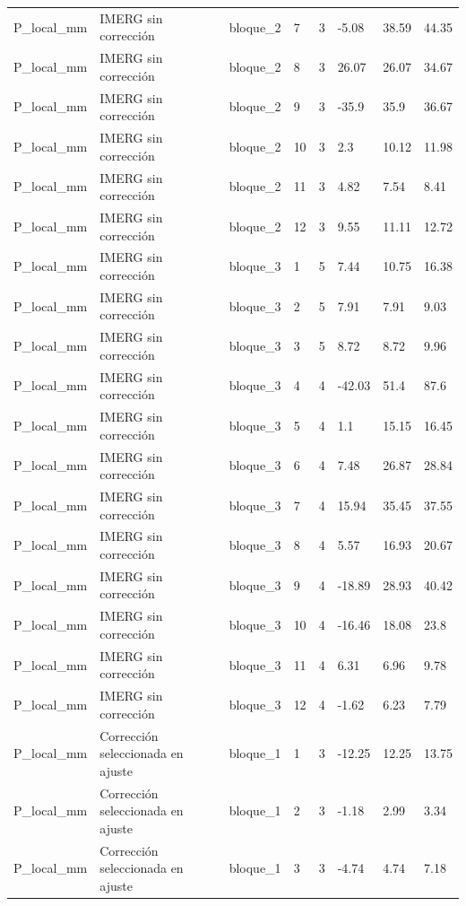 \begin{longtable}{llllllll}
P\_local\_mm & IMERG sin corrección & bloque\_2 & 7 & 3 & -5.08 & 38.59 & 44.35 \\
P\_local\_mm & IMERG sin corrección & bloque\_2 & 8 & 3 & 26.07 & 26.07 & 34.67 \\
P\_local\_mm & IMERG sin corrección & bloque\_2 & 9 & 3 & -35.9 & 35.9 & 36.67 \\
P\_local\_mm & IMERG sin corrección & bloque\_2 & 10 & 3 & 2.3 & 10.12 & 11.98 \\
P\_local\_mm & IMERG sin corrección & bloque\_2 & 11 & 3 & 4.82 & 7.54 & 8.41 \\
P\_local\_mm & IMERG sin corrección & bloque\_2 & 12 & 3 & 9.55 & 11.11 & 12.72 \\
P\_local\_mm & IMERG sin corrección & bloque\_3 & 1 & 5 & 7.44 & 10.75 & 16.38 \\
P\_local\_mm & IMERG sin corrección & bloque\_3 & 2 & 5 & 7.91 & 7.91 & 9.03 \\
P\_local\_mm & IMERG sin corrección & bloque\_3 & 3 & 5 & 8.72 & 8.72 & 9.96 \\
P\_local\_mm & IMERG sin corrección & bloque\_3 & 4 & 4 & -42.03 & 51.4 & 87.6 \\
P\_local\_mm & IMERG sin corrección & bloque\_3 & 5 & 4 & 1.1 & 15.15 & 16.45 \\
P\_local\_mm & IMERG sin corrección & bloque\_3 & 6 & 4 & 7.48 & 26.87 & 28.84 \\
P\_local\_mm & IMERG sin corrección & bloque\_3 & 7 & 4 & 15.94 & 35.45 & 37.55 \\
P\_local\_mm & IMERG sin corrección & bloque\_3 & 8 & 4 & 5.57 & 16.93 & 20.67 \\
P\_local\_mm & IMERG sin corrección & bloque\_3 & 9 & 4 & -18.89 & 28.93 & 40.42 \\
P\_local\_mm & IMERG sin corrección & bloque\_3 & 10 & 4 & -16.46 & 18.08 & 23.8 \\
P\_local\_mm & IMERG sin corrección & bloque\_3 & 11 & 4 & 6.31 & 6.96 & 9.78 \\
P\_local\_mm & IMERG sin corrección & bloque\_3 & 12 & 4 & -1.62 & 6.23 & 7.79 \\
P\_local\_mm & Corrección seleccionada en ajuste & bloque\_1 & 1 & 3 & -12.25 & 12.25 & 13.75 \\
P\_local\_mm & Corrección seleccionada en ajuste & bloque\_1 & 2 & 3 & -1.18 & 2.99 & 3.34 \\
P\_local\_mm & Corrección seleccionada en ajuste & bloque\_1 & 3 & 3 & -4.74 & 4.74 & 7.18 \\

\end{longtable}
